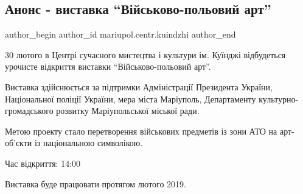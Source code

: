  
 
 
 
 

\subsection{Анонс - виставка \enquote{Військово-польовий арт}}
\label{sec:29_01_2019.fb.mariupol.centr.kuindzhi.1.anons_vystavka_vijskovo_poljovyj_art}

\ifcmt
 author_begin
   author_id mariupol.centr.kuindzhi
 author_end
\fi

30 лютого в Центрі сучасного мистецтва і культури ім. Куїнджі відбудеться
урочисте відкриття виставки \enquote{Військово-польовий арт}. 

Виставка здійснюється за підтримки Адміністрації Президента України,
Національної поліції України, мера міста Маріуполь, Департаменту
культурно-громадського розвитку Маріупольської міської ради.

Метою проекту стало перетворення військових предметів із зони АТО на
арт-об'єкти із національною символікою. 

Час відкриття: 14:00

Виставка буде працювати протягом лютого 2019.
